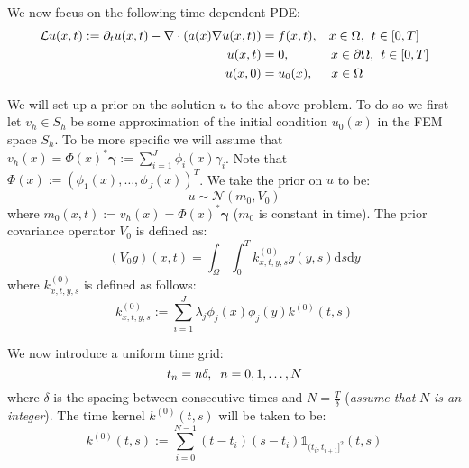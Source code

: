 \documentclass{article}
\theoremstyle{definition}
\theoremstyle{remark}
\theoremstyle{remark}
\begin{document}
\setlength\parskip{10pt}
\setlength\parindent{20pt}

\noindent We now focus on the following time-dependent PDE:
\begin{align}
        \mathcal{L}u(x,t) := \partial_{t}u(x,t) -\nabla\cdot(a(x)\nabla u(x,t))&=f(x,t), \hspace{0.3cm} x\in\Omega, \hspace{0.15cm} t\in[0,T] \\
        u(x,t) &= 0, \hspace{1.15cm} x\in\partial\Omega, \hspace{0.15cm} t\in[0,T] \\
        u(x,0) &= u_{0}(x), \hspace{0.5cm} x\in\Omega
\end{align}

\noindent We will set up a prior on the solution $u$ to the above problem. To do so we first let $v_{h}\in S_{h}$ be some approximation of the initial condition $u_{0}(x)$ in the FEM space $S_{h}$. To be more specific we will assume that $v_{h}(x)=\Phi(x)^{*}\boldsymbol{\gamma}:=\sum_{i=1}^{J}\phi_{i}(x)\gamma_{i}$. Note that $\Phi(x):=(\phi_{1}(x),\dots,\phi_{J}(x))^{T}$. We take the prior on $u$ to be:
\begin{equation}
    u\sim\mathcal{N}(m_{0},V_{0})
\end{equation}
where $m_{0}(x,t):=v_{h}(x)=\Phi(x)^{*}\boldsymbol{\gamma}$ ($m_{0}$ is constant in time). The prior covariance operator $V_{0}$ is defined as:
\begin{equation}
    (V_{0}g)(x,t)=\int_{\Omega}\int_{0}^{T}k_{x,t,y,s}^{(0)}g(y,s)\mathrm{d}s\mathrm{d}y
\end{equation}
where $k_{x,t,y,s}^{(0)}$ is defined as follows:
\begin{equation}
    k_{x,t,y,s}^{(0)}:=\sum_{i=1}^{J}\lambda_{j}\phi_{j}(x)\phi_{j}(y)k^{(0)}(t,s)
\end{equation}

\noindent We now introduce a uniform time grid:
\begin{equation*}
    t_{n}=n\delta, \hspace{0.2cm} n=0,1,\dots,N
\end{equation*}
where $\delta$ is the spacing between consecutive times and $N=\frac{T}{\delta}$ (\textit{assume that} $N$ \textit{is an integer}). The time kernel $k^{(0)}(t,s)$ will be taken to be:
\begin{equation}
    k^{(0)}(t,s):=\sum_{i=0}^{N-1}(t-t_{i})(s-t_{i})\mathbb{1}_{(t_{i},t_{i+1}]^{2}}(t,s)
\end{equation}
\end{document}
